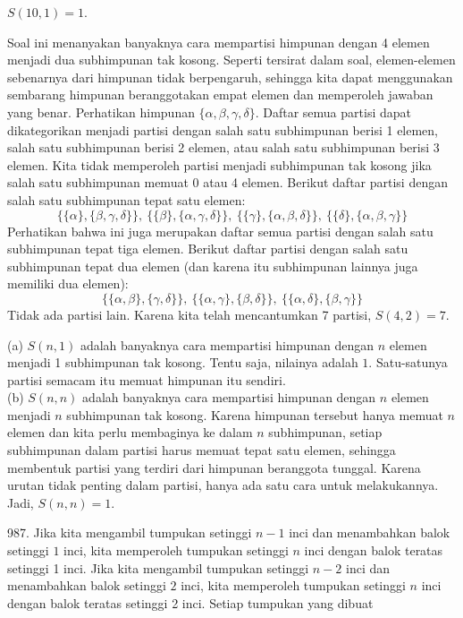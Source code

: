 \begin{description}
$S(10,1)=1$.
\item [{\ref{exc:recursion-5}:}] Soal ini menanyakan banyaknya cara mempartisi
himpunan dengan 4 elemen menjadi dua subhimpunan tak kosong. Seperti
tersirat dalam soal, elemen-elemen sebenarnya dari himpunan tidak
berpengaruh, sehingga kita dapat menggunakan sembarang himpunan beranggotakan
empat elemen dan memperoleh jawaban yang benar. Perhatikan himpunan
$\{\alpha,\beta,\gamma,\delta\}$. Daftar semua partisi dapat dikategorikan
menjadi partisi dengan salah satu subhimpunan berisi 1 elemen, salah
satu subhimpunan berisi 2 elemen, atau salah satu subhimpunan berisi
3 elemen. Kita tidak memperoleh partisi menjadi subhimpunan tak kosong
jika salah satu subhimpunan memuat 0 atau 4 elemen. Berikut daftar
partisi dengan salah satu subhimpunan tepat satu elemen:
\[
\{\{\alpha\},\{\beta,\gamma,\delta\}\},\ \{\{\beta\},\{\alpha,\gamma,\delta\}\},\ \{\{\gamma\},\{\alpha,\beta,\delta\}\},\ \{\{\delta\},\{\alpha,\beta,\gamma\}\}
\]
Perhatikan bahwa ini juga merupakan daftar semua partisi dengan salah
satu subhimpunan tepat tiga elemen. Berikut daftar partisi dengan
salah satu subhimpunan tepat dua elemen (dan karena itu subhimpunan
lainnya juga memiliki dua elemen):
\[
\{\{\alpha,\beta\},\{\gamma,\delta\}\},\ \{\{\alpha,\gamma\},\{\beta,\delta\}\},\ \{\{\alpha,\delta\},\{\beta,\gamma\}\}
\]
Tidak ada partisi lain. Karena kita telah mencantumkan 7 partisi,
$S(4,2)=7$.
\item [{\ref{exc:recursion-6}:}] (a) $S(n,1)$ adalah banyaknya cara mempartisi
himpunan dengan $n$ elemen menjadi 1 subhimpunan tak kosong. Tentu
saja, nilainya adalah $1$. Satu-satunya partisi semacam itu memuat
himpunan itu sendiri.\\
(b) $S(n,n)$ adalah banyaknya cara mempartisi himpunan dengan $n$
elemen menjadi $n$ subhimpunan tak kosong. Karena himpunan tersebut
hanya memuat $n$ elemen dan kita perlu membaginya ke dalam $n$ subhimpunan,
setiap subhimpunan dalam partisi harus memuat tepat satu elemen, sehingga
membentuk partisi yang terdiri dari himpunan beranggota tunggal. Karena
urutan tidak penting dalam partisi, hanya ada satu cara untuk melakukannya.
Jadi, $S(n,n)=1$.
\item [{\ref{exc:recursion-8}:}] 987. Jika kita mengambil tumpukan setinggi
$n-1$ inci dan menambahkan balok setinggi $1$ inci, kita memperoleh
tumpukan setinggi $n$ inci dengan balok teratas setinggi 1 inci.
Jika kita mengambil tumpukan setinggi $n-2$ inci dan menambahkan
balok setinggi $2$ inci, kita memperoleh tumpukan setinggi $n$ inci
dengan balok teratas setinggi 2 inci. Setiap tumpukan yang dibuat

\end{description}
